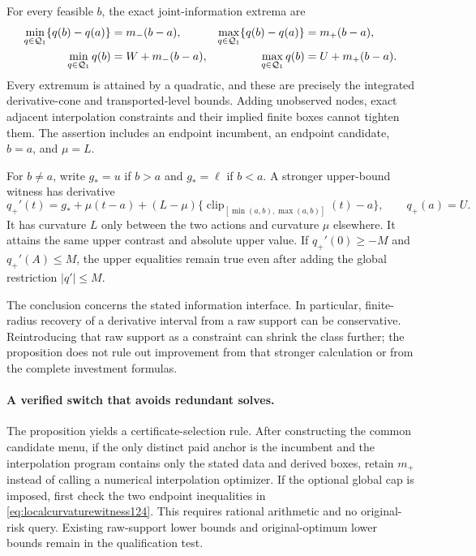 \begin{proposition}
\label{prop:saturation124}
For every feasible $b$, the exact joint-information extrema are
\begin{align}
 \min_{q\in\mathcal Q_1}\{q(b)-q(a)\}&=m_-(b-a),&
 \max_{q\in\mathcal Q_1}\{q(b)-q(a)\}&=m_+(b-a),\notag\\
 \min_{q\in\mathcal Q_1}q(b)&=W+m_-(b-a),&
 \max_{q\in\mathcal Q_1}q(b)&=U+m_+(b-a).
 \label{eq:saturationextrema124}
\end{align}
Every extremum is attained by a quadratic, and these are precisely the
integrated derivative-cone and transported-level bounds. Adding unobserved
nodes, exact adjacent interpolation constraints and their implied finite
boxes cannot tighten them. The assertion includes an endpoint incumbent,
an endpoint candidate, $b=a$, and $\mu=L$.

For $b\ne a$, write $g_*=u$ if $b>a$ and $g_*=\ell$ if $b<a$.
A stronger upper-bound witness has derivative
\begin{equation}\label{eq:localcurvaturewitness124}
 q_+'(t)=g_*+\mu(t-a)+(L-\mu)
       \{\operatorname{clip}_{[\min(a,b),\max(a,b)]}(t)-a\},
 \qquad q_+(a)=U.
\end{equation}
It has curvature $L$ only between the two actions and curvature $\mu$
elsewhere. It attains the same upper contrast and absolute upper value.
If $q_+'(0)\ge-M$ and $q_+'(A)\le M$, the upper equalities remain
true even after adding the global restriction $|q'|\le M$.
\end{proposition}

The conclusion concerns the stated information interface. In particular,
finite-radius recovery of a derivative interval from a raw support can be
conservative. Reintroducing that raw support as a constraint can shrink
the class further; the proposition does not rule out improvement from
that stronger calculation or from the complete investment formulas.

\paragraph{A verified switch that avoids redundant solves.}
The proposition yields a certificate-selection rule. After constructing
the common candidate menu, if the only distinct paid anchor is the
incumbent and the interpolation program contains only the stated data
and derived boxes, retain $m_+$ instead of calling a numerical
interpolation optimizer. If the optional global cap is imposed, first
check the two endpoint inequalities in
\eqref{eq:localcurvaturewitness124}. This requires rational arithmetic
and no original-risk query. Existing raw-support lower bounds and
original-optimum lower bounds remain in the qualification test.

